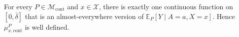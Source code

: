 For every \(P\in\mathcal M_{\mathrm{cont}}\) and \(x\in\mathcal X\), there is exactly one continuous function on \([0,\bar\delta]\) that is an almost-everywhere version of \(\mathbb E_P[Y\mid A=a,X=x]\).  Hence \(\mu_{x,\mathrm{cont}}^P\) is well defined.